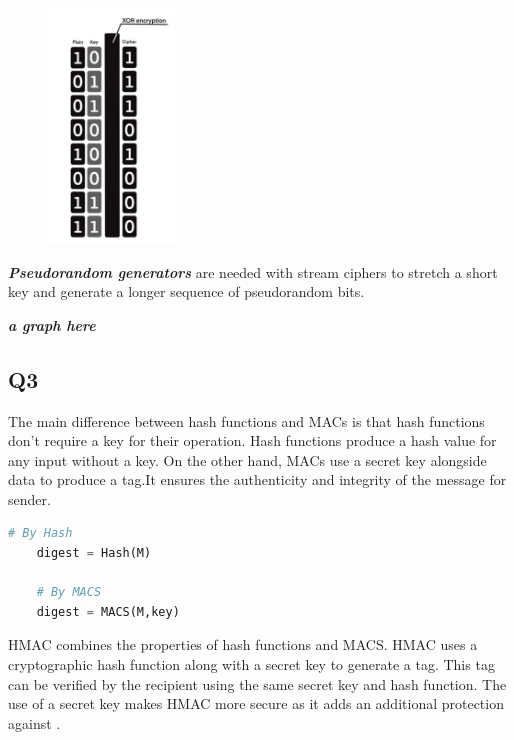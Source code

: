 \documentclass{article}
\begin{document}
    \begin{figure}[htbp]
        \centering %
        \includegraphics[width=0.3\textwidth]{graphs/Stream_cipher.jpg} %
    \end{figure}

	\textbf{\textit{Pseudorandom generators}} are needed with stream ciphers to stretch a short key and generate a longer sequence of pseudorandom bits\cite{3-1.Symmetric-Crypto}. 
	\begin{center}
		\textbf{\textit{a graph here}}
	\end{center}

\newpage

\subsection{Q3}
	The main difference between hash functions and MACs is that hash functions don't require a key for their operation. Hash functions produce a hash value for any input without a key. On the other hand, MACs use a secret key alongside data to produce a tag.It ensures the authenticity and integrity of the message for sender\cite{3-1.Symmetric-Crypto}.

	\begin{lstlisting}[language=Python]
	# By Hash
	digest = Hash(M)

	# By MACS
	digest = MACS(M,key)
	\end{lstlisting}

	HMAC combines the properties of hash functions and MACS. HMAC uses a cryptographic hash function along with a secret key to generate a tag. This tag can be verified by the recipient using the same secret key and hash function. The use of a secret key makes HMAC more secure as it adds an additional protection against .
\end{document}
